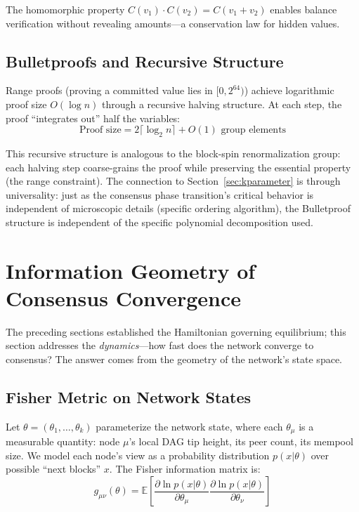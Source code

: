 \documentclass[12pt,a4paper,twocolumn]{article}
\begin{document}
The homomorphic property $C(v_1) \cdot C(v_2) = C(v_1 + v_2)$ enables balance verification without revealing amounts---a conservation law for hidden values.

\subsection{Bulletproofs and Recursive Structure}

Range proofs (proving a committed value lies in $[0, 2^{64})$) achieve logarithmic proof size $O(\log n)$ through a recursive halving structure. At each step, the proof ``integrates out'' half the variables:
\begin{equation}
\text{Proof size} = 2 \lceil \log_2 n \rceil + O(1) \text{ group elements}
\end{equation}

This recursive structure is analogous to the block-spin renormalization group: each halving step coarse-grains the proof while preserving the essential property (the range constraint). The connection to Section~\ref{sec:kparameter} is through universality: just as the consensus phase transition's critical behavior is independent of microscopic details (specific ordering algorithm), the Bulletproof structure is independent of the specific polynomial decomposition used.

\section{Information Geometry of Consensus Convergence}
\label{sec:infogeo}

The preceding sections established the Hamiltonian governing equilibrium; this section addresses the \emph{dynamics}---how fast does the network converge to consensus? The answer comes from the geometry of the network's state space.

\subsection{Fisher Metric on Network States}

Let $\theta = (\theta_1, \ldots, \theta_k)$ parameterize the network state, where each $\theta_\mu$ is a measurable quantity: node $\mu$'s local DAG tip height, its peer count, its mempool size. We model each node's view as a probability distribution $p(x|\theta)$ over possible ``next blocks'' $x$. The Fisher information matrix is:
\begin{equation}
g_{\mu\nu}(\theta) = \mathbb{E}\left[\frac{\partial \ln p(x|\theta)}{\partial \theta_\mu} \frac{\partial \ln p(x|\theta)}{\partial \theta_\nu}\right]
\end{equation}
\end{document}
